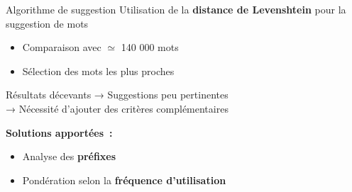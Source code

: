 \begin{frame}{Algorithme de suggestion}
	Utilisation de la \textbf{distance de Levenshtein} pour la suggestion de mots

	\begin{itemize}
		\item Comparaison avec $\simeq$ 140 000 mots
		\item Sélection des mots les plus proches
	\end{itemize}

	\begin{block}{\alert{Résultats décevants}}
		\vspace{5pt}
		→ Suggestions peu pertinentes\\
		→ Nécessité d’ajouter des critères complémentaires
	\end{block}

	\textbf{Solutions apportées~:}
	\begin{itemize}
		\item Analyse des \textbf{préfixes}
		\item Pondération selon la \textbf{fréquence d'utilisation}
	\end{itemize}
\end{frame}

